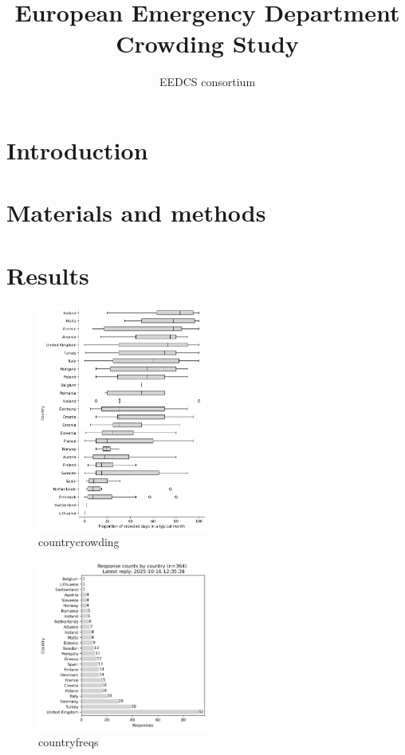 \documentclass{article}
\title{European Emergency Department Crowding Study}
\author{EEDCS consortium}
\begin{document}
\maketitle


\begin{abstract}
    \lipsum[1]    
\end{abstract}


\section{Introduction}
\lipsum[2]
\section{Materials and methods}
\lipsum[3]
\section{Results}

\begin{figure}[H]
    \centering
        \includegraphics[width=0.5\textwidth]{../output/plots/country_crowding}
        \caption{countrycrowding}
        \label{fig:country_crowding}
\end{figure}

\begin{figure}[H]
    \centering
        \includegraphics[width=0.5\textwidth]{../output/plots/country_freqs}
        \caption{countryfreqs}
        \label{fig:country_freqs}
\end{figure}
\end{document}
